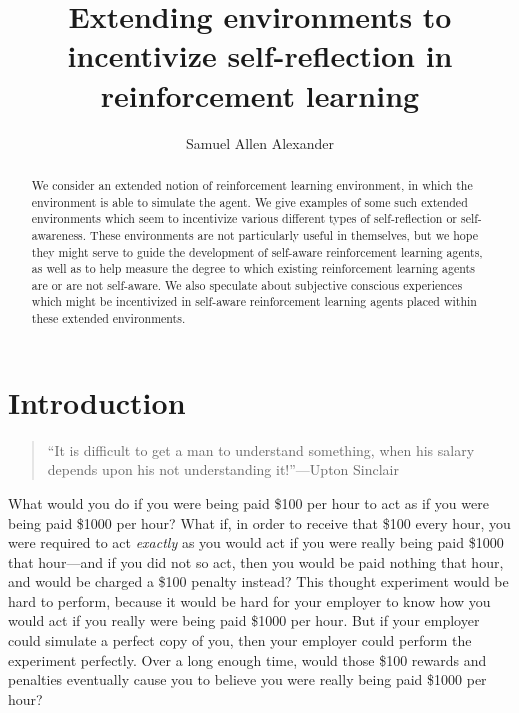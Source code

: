\documentclass[runningheads]{llncs}
\begin{document}
\title{Extending environments to incentivize self-reflection
in reinforcement learning}

\author{Samuel Allen Alexander}

\maketitle

\begin{abstract}
    We consider an extended notion
    of reinforcement learning environment, in which the environment is able
    to simulate the agent. We give
    examples of some such extended environments which seem to incentivize
    various different types of self-reflection or self-awareness.
    These environments are not particularly useful in themselves, but we
    hope they might serve to guide the development of self-aware reinforcement
    learning agents, as well as to help measure the degree to which existing
    reinforcement learning agents are or are not self-aware. We also speculate
    about subjective conscious experiences which
    might be incentivized in self-aware reinforcement learning agents
    placed within these extended environments.
\end{abstract}

\section{Introduction}

\begin{quote}
    ``It is difficult to get a man to understand something, when his salary depends
    upon his not understanding it!''---Upton Sinclair
\end{quote}

What would you do if you were being paid \$100 per hour to act as if you were being
paid \$1000 per hour? What if, in order to receive that \$100 every hour, you were
required to act \emph{exactly} as you would act if you were really being paid
\$1000 that hour---and if you did not so act, then you would be paid nothing that hour,
and would be charged a \$100 penalty instead?
This thought experiment would be hard to perform, because it would be hard for your
employer to know how you would act if you really were being paid \$1000 per hour.
But if your employer could simulate a perfect copy of you, then your employer could
perform the experiment perfectly. Over a long enough time, would those \$100 rewards
and penalties eventually cause you to believe you were really being paid
\$1000 per hour?
\end{document}
